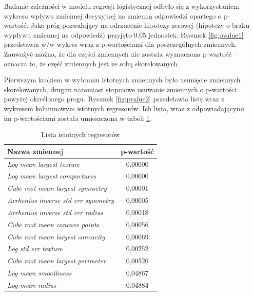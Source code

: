 Badanie zależności w modelu regresji logistycznej odbyło się z wykorzystaniem wykresu wpływu zmiennej decyzyjnej na zmienną odpowiedzi opartego o p-wartość. Jako próg pozwalający na odrzucenie hipotezy zerowej (hipotezy o braku wypływu zmiennej na odpowiedź) przyjęto 0,05 jednostek. Rysunek \ref{fig:pvalue1} przedstawia w/w wykres wraz z p-wartościami dla poszczególnych zmiennych. Zauważyć można, że dla części zmiennych nie została wyznaczona p-wartość -- oznacza to, że część zmiennych jest ze sobą skorelowanych.

Pierwszym krokiem w wybraniu istotnych zmiennych było usunięcie zmiennych skorelowanych, drugim natomiast stopniowe usuwanie zmiennych o p-wartości powyżej określonego progu. Rysunek \ref{fig:pvalue2} przedstawia listę wraz z wykresem kolumnowym istotnych regresorów. Ich lista, wraz z odpowiadającymi im p-wartościami została umieszczona w tabeli \ref{lin_reg:1}.

\begin{table}
	\centering
	\begin{tabular}{l|c}
		Nazwa zmiennej & p-wartość \\
		\hline
		\textit{Log mean largest texture} & 0,00000 \\
		\textit{Log mean largest compactness} & 0,00000 \\
		\textit{Cube root mean largest symmetry} & 0,00001 \\
		\textit{Arrhenius inverse std err symmetry} & 0,00005 \\
		\textit{Arrhenius inverse std err radius} & 0,00018 \\
		\textit{Cube root mean concave points} & 0,00056 \\
		\textit{Cube root mean largest concavity} & 0,00069 \\
		\textit{Log std err texture} & 0,00252 \\
		\textit{Cube root mean largest perimeter} & 0,00526 \\
		\textit{Log mean smoothness} & 0,04867 \\
		\textit{Log mean radius} & 0,04884
	\end{tabular}
	\caption{Lista istotnych regresorów}
	\label{lin_reg:1}
\end{table}

